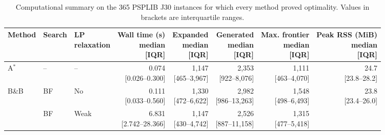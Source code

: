 \begin{table}[t]
  \centering
  \caption{Computational summary on the 365 PSPLIB J30 instances for which
  every method proved optimality. Values in brackets are interquartile ranges.}
  \label{tab:astar-bb-computational-summary}
  \small
  \setlength{\tabcolsep}{3pt}
  \begin{tabular}{@{}lllrrrrr@{}}
    \toprule
    Method &
    Search &
    \shortstack{LP\\relaxation} &
    \shortstack{Wall time (s)\\median\\{[IQR]}} &
    \shortstack{Expanded\\median\\{[IQR]}} &
    \shortstack{Generated\\median\\{[IQR]}} &
    \shortstack{Max. frontier\\median\\{[IQR]}} &
    \shortstack{Peak RSS (MiB)\\median\\{[IQR]}} \\
    \midrule
    A$^*$
      & --
      & --
      & \shortstack[r]{0.074\\{[0.026--0.300]}}
      & \shortstack[r]{1,147\\{[465--3,967]}}
      & \shortstack[r]{2,353\\{[922--8,076]}}
      & \shortstack[r]{1,111\\{[463--4,070]}}
      & \shortstack[r]{24.7\\{[23.8--28.2]}} \\
    B\&B
      & BF
      & No
      & \shortstack[r]{0.111\\{[0.033--0.560]}}
      & \shortstack[r]{1,330\\{[472--6,622]}}
      & \shortstack[r]{2,982\\{[986--13,263]}}
      & \shortstack[r]{1,548\\{[498--6,493]}}
      & \shortstack[r]{23.8\\{[23.4--26.0]}} \\
      & BF
      & Weak
      & \shortstack[r]{6.831\\{[2.742--28.366]}}
      & \shortstack[r]{1,147\\{[430--4,742]}}
      & \shortstack[r]{2,526\\{[887--11,158]}}
      & \shortstack[r]{1,315\\{[477--5,418]}}

\end{tabular}
\end{table}

